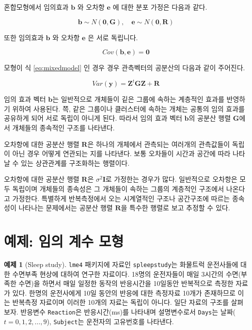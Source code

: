 \documentclass[
]{book}
\theoremstyle{definition}
\theoremstyle{definition}
\newtheorem{example}{예제}[chapter]
\theoremstyle{definition}
\theoremstyle{remark}
\begin{document}
혼합모형에서 임의효과 \(\bm b\) 와 오차항 \(\bm e\) 에 대한 분포 가정은 다음과 같다.

\begin{equation}
\bm b \sim N( \bm 0, \bm G), \quad \bm e \sim N(\bm 0, \bm R)
\label{eq:mixedassume}
\end{equation}

또한 임의효과 \(\bm b\) 와 오차항 \(\bm e\) 은 서로 독립니다.

\[ Cov( \bm b, \bm e) = \bm 0 \]

모형이 식 \eqref{eq:mixedmodel} 인 경우 경우 관측벡터의 공분산의 다음과 같이 주어진다.

\[ Var( \bm y) = \bm Z^t \bm G \bm Z + \bm R \]

임의 효과 벡터 \(\bm b\)는 일반적으로 개체들이 깉은 그룹에 속하는 계층적인
효과를 반영하기 위하여 사용된다. 쯕, 같은 그룹이나 클러스터에 속하는 개체는 공통의 임의 효과를 공유하게 되어 서로 독립이 아니게 된다. 따라서 임의 효과 벡터 \(\bm b\)의 공분산 행렬 \(\bm G\)에서 개체들의 종속적인 구조를 나타낸다.

오차항에 대한 공분산 행렬 \(\bm R\)은 하나의 개체에서 관측되는 여러개의 관측값들이 독립이 아닌 경우 어떻게 연관되는 지를 나타낸다. 보통 오차들이 시간과 공간에 따라 나타날 수 있는 상관관계를 구조화하는 행렬이다.

오차항에 대한 공분산 행렬 \(\bm R\)은 \(\sigma^2 \bm I\)로 가정한는 경우가 많다. 일반적으로 오차항은 모두 독립이며 개체들의 종속성은 그 개체들이 속하는 그룹의 계층적인 구조에서 나온다고 가정한다. 특별하게 반복측정에서 오는 시계열적인 구조나 공간구조에 따르는 종속성이 나타나는 문제에서는 공분산 행렬 \(\bm R\)을 특수한 행렬로 보고 추정할 수 있다.

\hypertarget{uxc608uxc81c-uxc784uxc758-uxacc4uxc218-uxbaa8uxd615}{%
\section{예제: 임의 계수 모형}\label{uxc608uxc81c-uxc784uxc758-uxacc4uxc218-uxbaa8uxd615}}

\begin{example}[Sleep study]
\protect\hypertarget{exm:unnamed-chunk-5}{}{\label{exm:unnamed-chunk-5} {} }\texttt{lme4} 패키지에 자료인 \texttt{spleepstudy}는 화물트럭 운전사들에 대한 수면부족 현상에 대하여 연구한 자료이다. 18명의 운전자들이 매일 3시간의 수면(부족한 수면)을 하면서
매일 일정한 동작의 반응시간을 10일동안 반복적으로 측정한 자료가 있다. 한명의 운전사에게 10일 동안의 반응에 대한 측정자료 10개가 존재하므로 이는 반복측정 자료이며 이러한 10개의 자료는 독립이 아니다.
일단 자료의 구조를 살펴보자. 반응변수 \texttt{Reaction}은 반응시간(ms)를 나타내며 설명변수로서 \texttt{Days}는 날짜(\(t=0,1,2,\dots,9\)), \texttt{Subject}는 운전자의 고유번호를 나타낸다.
\end{example}
\end{document}
